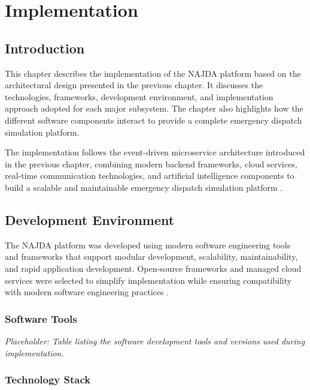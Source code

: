 \chapter{Implementation}
\label{chap:implementation}

\section{Introduction}

This chapter describes the implementation of the NAJDA platform based on the architectural design presented in the previous chapter. It discusses the technologies, frameworks, development environment, and implementation approach adopted for each major subsystem. The chapter also highlights how the different software components interact to provide a complete emergency dispatch simulation platform.

The implementation follows the event-driven microservice architecture introduced in the previous chapter, combining modern backend frameworks, cloud services, real-time communication technologies, and artificial intelligence components to build a scalable and maintainable emergency dispatch simulation platform \cite{springboot,nextjs,flutter,fastapi}.


\section{Development Environment}

The NAJDA platform was developed using modern software engineering tools and frameworks that support modular development, scalability, maintainability, and rapid application development. Open-source frameworks and managed cloud services were selected to simplify implementation while ensuring compatibility with modern software engineering practices \cite{springboot,nextjs,flutter,fastapi}.

\subsection{Software Tools}

\textit{Placeholder: Table listing the software development tools and versions used during implementation.}

\subsection{Technology Stack}


